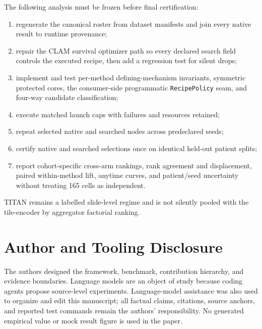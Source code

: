 \documentclass{article}
\begin{document}
The following analysis must be frozen before final certification:
\begin{enumerate}[leftmargin=*]
  \item regenerate the canonical roster from dataset manifests and join every
  native result to runtime provenance;
  \item repair the CLAM survival optimizer path so every declared search field
  controls the executed recipe, then add a regression test for silent drops;
  \item implement and test per-method defining-mechanism invariants, symmetric
  protected cores, the consumer-side programmatic \texttt{RecipePolicy} seam,
  and four-way candidate classification;
  \item execute matched launch caps with failures and resources retained;
  \item repeat selected native and searched nodes across predeclared seeds;
  \item certify native and searched selections once on identical held-out
  patient splits;
  \item report cohort-specific cross-arm rankings, rank agreement and
  displacement, paired within-method lift, anytime curves, and patient/seed
  uncertainty without treating 165 cells as independent.
\end{enumerate}
TITAN remains a labelled slide-level regime and is not silently pooled with the
tile-encoder by aggregator factorial ranking.

\section{Author and Tooling Disclosure}

The authors designed the framework, benchmark, contribution hierarchy, and
evidence boundaries.  Language models are an object of study because coding
agents propose source-level experiments.  Language-model assistance was also
used to organize and edit this manuscript; all factual claims, citations,
source anchors, and reported test commands remain the authors'
responsibility.  No generated empirical value or mock result figure is used in
the paper.


\end{document}
